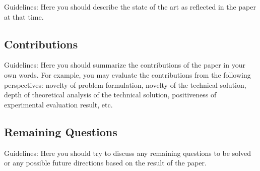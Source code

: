 \documentclass[conference]{IEEEtran}
\begin{document}
Guidelines: Here you should describe the state of the art as reflected in the paper at that time.
%



\subsection{Contributions}
Guidelines: Here you should summarize the contributions of the paper in your own words.
%
For example, you may evaluate the contributions from the following perspectives: novelty of problem formulation, novelty of the technical solution, depth of theoretical analysis of the technical solution, positiveness of experimental evaluation result, etc.

\subsection{Remaining Questions}
Guidelines: Here you should try to discuss any remaining questions to be solved or any possible future directions based on the result of the paper.



\end{document}
